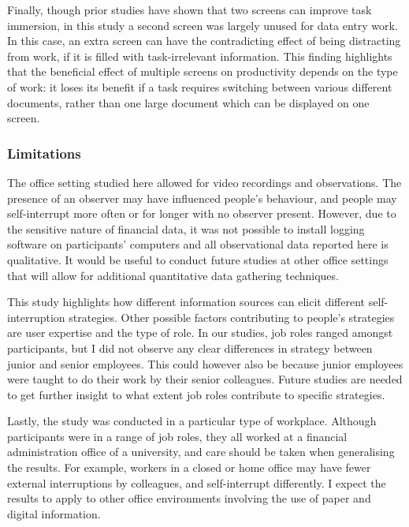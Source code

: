Finally, though prior studies have shown that two screens can improve task immersion, in this study a second screen was largely unused for data entry work. In this case, an extra screen can have the contradicting effect of being distracting from work, if it is filled with task-irrelevant information. This finding highlights that the beneficial effect of multiple screens on productivity depends on the type of work: it loses its benefit if a task requires switching between various different documents, rather than one large document which can be displayed on one screen.

\subsubsection{Limitations}
The office setting studied here allowed for video recordings and observations. The presence of an observer may have influenced people's behaviour, and people may self-interrupt more often or for longer with no observer present. However, due to the sensitive nature of financial data, it was not possible to install logging software on participants' computers and all observational data reported here is qualitative. It would be useful to conduct future studies at other office settings that will allow for additional quantitative data gathering techniques. 

This study highlights how different information sources can elicit different self-interruption strategies. Other possible factors contributing to people's strategies are user expertise and the type of role. In our studies, job roles ranged amongst participants, but I did not observe any clear differences in strategy between junior and senior employees. This could however also be because junior employees were taught to do their work by their senior colleagues. Future studies are needed to get further insight to what extent job roles contribute to specific strategies.

Lastly, the study was conducted in a particular type of workplace. Although participants were in a range of job roles, they all worked at a financial administration office of a university, and care should be taken when generalising the results. For example, workers in a closed or home office may have fewer external interruptions by colleagues, and self-interrupt differently. I expect the results to apply to other office environments involving the use of paper and digital information.

